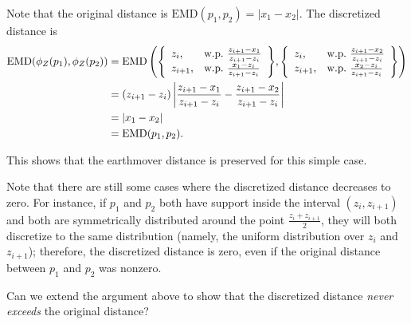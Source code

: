 \documentclass[11pt]{article}
\newenvironment{lrcases}
  {\left\lbrace\begin{array}{ll}}
  {\end{array}\right\rbrace}
\newcommand{\EMD}{\mathrm{EMD}}
\newcommand{\abs}[1]{\left\lvert#1\right\rvert}
\theoremstyle{definition}
\begin{document}
Note that the original distance is $\EMD(p_1,p_2) = \abs{x_1-x_2}$.  The discretized distance is
\begin{align*}
\EMD(\phi_Z(p_1), \phi_Z(p_2))
&=
\EMD\left(
\begin{lrcases}
z_i, & \text{w.p.\ $\frac{z_{i+1}-x_1}{z_{i+1}-z_i}$} \\
z_{i+1}, & \text{w.p.\ $\frac{x_1-z_i}{z_{i+1}-z_i}$}
\end{lrcases}
,
\begin{lrcases}
z_i, & \text{w.p.\ $\frac{z_{i+1}-x_2}{z_{i+1}-z_i}$} \\
z_{i+1}, & \text{w.p.\ $\frac{x_2-z_i}{z_{i+1}-z_i}$}
\end{lrcases}
\right) \\
&= (z_{i+1}-z_i) \abs{\frac{z_{i+1}-x_1}{z_{i+1}-z_i} - \frac{z_{i+1}-x_2}{z_{i+1}-z_i}} \\
&= \abs{x_1 - x_2} \\
&= \EMD(p_1, p_2).
\end{align*}

This shows that the earthmover distance is preserved for this simple case.

Note that there are still some cases where the discretized distance decreases to zero.  For instance, if $p_1$ and $p_2$ both have support inside the interval $(z_i, z_{i+1})$ and both are symmetrically distributed around the point $\frac{z_i + z_{i+1}}{2}$, they will both discretize to the same distribution (namely, the uniform distribution over $z_i$ and $z_{i+1}$); therefore, the discretized distance is zero, even if the original distance between $p_1$ and $p_2$ was nonzero.

Can we extend the argument above to show that the discretized distance \emph{never exceeds} the original distance?
\end{document}
